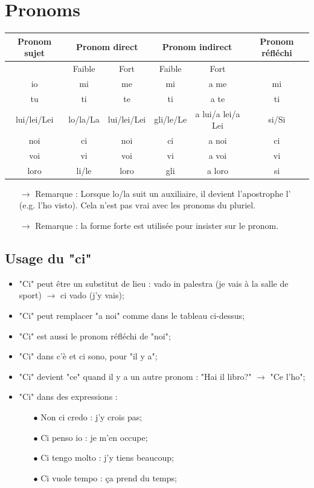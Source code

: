 \documentclass[12pt, openany]{report}
\begin{document}
\section{Pronoms}
\begin{center}
    \begin{tabular}{c|c|c|c|c|c}
        Pronom sujet & \multicolumn{2}{c|}{Pronom direct} & \multicolumn{2}{c|}{Pronom indirect} & Pronom réfléchi \\ \hline 
        & Faible & Fort & Faible & Fort & \\ \hline 
        io & mi & me & mi & a me & mi\\
        tu & ti & te & ti & a te & ti\\
        lui/lei/Lei & lo/la/La & lui/lei/Lei & gli/le/Le & a lui/a lei/a Lei & si/Si\\
        noi & ci & noi & ci & a noi & ci\\
        voi & vi & voi & vi & a voi & vi\\
        loro & li/le & loro & gli & a loro & si\\
    \end{tabular}
\end{center}
\begin{itemize}
    \item [$\to$] Remarque : Lorsque lo/la suit un auxiliaire, il devient l'apostrophe l' (e.g. l'ho visto). Cela n'est pas vrai avec les pronoms du pluriel.
    \item [$\to$] Remarque : la forme forte est utilisée pour insister sur le pronom.
\end{itemize}
\subsection{Usage du "ci"}
\begin{itemize}
    \item "Ci" peut être un substitut de lieu : vado in palestra (je vais à la salle de sport) $\rightarrow$ ci vado (j'y vais);
    \item "Ci" peut remplacer "a noi" comme dans le tableau ci-dessus;
    \item "Ci" est aussi le pronom réfléchi de "noi";
    \item "Ci" dans c'è et ci sono, pour "il y a";
    \item "Ci" devient "ce" quand il y a un autre pronom : "Hai il libro?" $\rightarrow$ "Ce l'ho";
    \item "Ci" dans des expressions :
    \begin{itemize}
        \item [$\bullet$] Non ci credo : j'y crois pas;
        \item [$\bullet$] Ci penso io : je m'en occupe;
        \item [$\bullet$] Ci tengo molto : j'y tiens beaucoup;
        \item [$\bullet$] Ci vuole tempo : ça prend du temps;
    \end{itemize}
\end{itemize}
\end{document}
